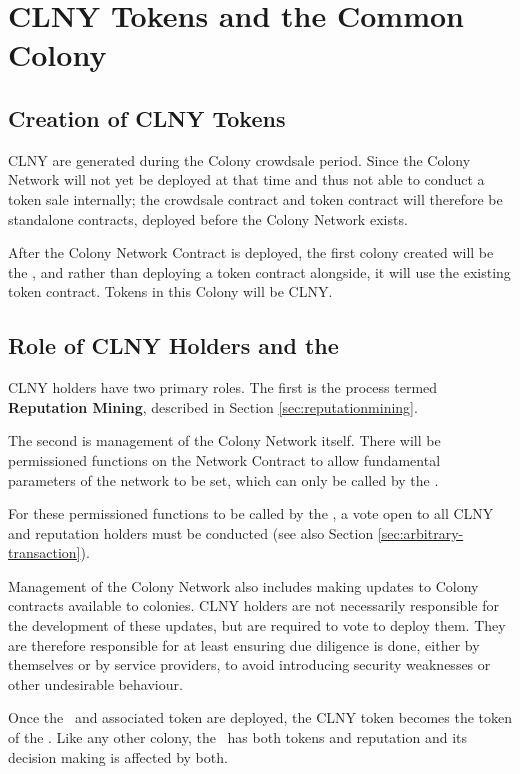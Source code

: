 \section{CLNY Tokens and the Common Colony}\label{sec:clny}

\subsection{Creation of CLNY Tokens}
CLNY are generated during the Colony crowdsale period. Since the Colony Network will not yet be deployed at that time and thus not able to conduct a token sale internally; the crowdsale contract and token contract will therefore be standalone contracts, deployed before the Colony Network exists.

After the Colony Network Contract is deployed, the first colony created will be the \rc, and rather than deploying a token contract alongside, it will use the existing token contract. Tokens in this Colony will be CLNY. 

\subsection{Role of CLNY Holders and the \rc}
CLNY holders have two primary roles. The first is the process termed \textbf{Reputation Mining}, described in Section \ref{sec:reputationmining}.

The second is management of the Colony Network itself. There will be permissioned functions on the Network Contract to allow fundamental parameters of the network to be set, which can only be called by the \rc.

For these permissioned functions to be called by the \rc, a vote open to all CLNY and reputation holders must be conducted  (see also Section \ref{sec:arbitrary-transaction}).

Management of the Colony Network also includes making updates to Colony contracts available to colonies. CLNY holders are not necessarily responsible for the development of these updates, but are required to vote to deploy them. They are therefore responsible for at least ensuring due diligence is done, either by themselves or by service providers, to avoid introducing security weaknesses or other undesirable behaviour.

Once the \rc\ and associated token are deployed, the CLNY token becomes the token of the \rc. Like any other colony, the \rc\ has both tokens and reputation and its decision making is affected by both.


